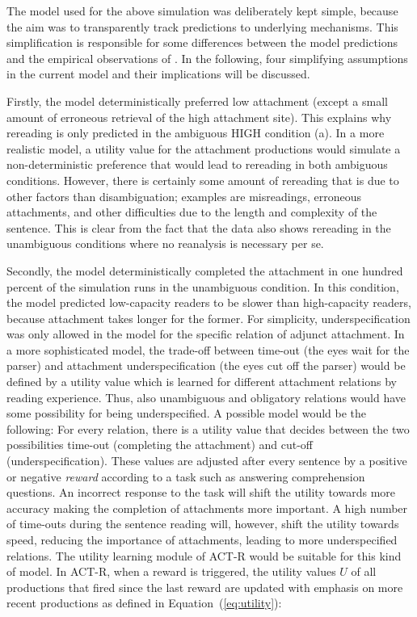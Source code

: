 \documentclass{cambridge7A}\usepackage[]{graphicx}\usepackage[]{color}
\begin{document}
The model used for the above simulation was deliberately kept simple, because the aim was to transparently track predictions to underlying mechanisms. This simplification is responsible for some differences between the model predictions and the empirical observations of \cite{MalsburgVasishth2013}. In the following, four simplifying assumptions in the current model and their implications will be discussed.

Firstly, the model deterministically preferred low attachment (except a small amount of erroneous retrieval of the high attachment site). This explains why rereading is only predicted in the ambiguous HIGH condition (a). In a more realistic model, a utility value for the attachment productions would simulate a non-deterministic preference that would lead to rereading in both ambiguous conditions. However, there is certainly some amount of rereading that is due to other factors than disambiguation; examples are misreadings, erroneous attachments, and other difficulties due to the length and complexity of the sentence. This is clear from the fact that the data also shows rereading in the unambiguous conditions where no reanalysis is necessary per se.

Secondly, the model deterministically completed the attachment in one hundred percent of the simulation runs in the unambiguous condition. In this condition, the model predicted low-capacity readers to be slower than high-capacity readers, because attachment takes longer for the former. For simplicity, underspecification was only allowed in the model for the specific relation of adjunct attachment.
In a more sophisticated model, the trade-off between time-out (the eyes wait for the parser) and attachment underspecification (the eyes cut off the parser) would be defined by a utility value which is learned for different attachment relations by reading experience. Thus, also unambiguous and obligatory relations would have some possibility for being underspecified. 
A possible model would be the following:
For every relation, there is a utility value that decides between the two possibilities time-out (completing the attachment) and cut-off (underspecification). These values are adjusted after every sentence by a positive or negative \emph{reward} according to a task such as answering comprehension questions. An incorrect response to the task will shift the utility towards more accuracy making the completion of attachments more important. A high number of time-outs during the sentence reading will, however, shift the utility towards speed, reducing the importance of attachments, leading to more underspecified relations. 
The utility learning module of ACT-R would be suitable for this kind of model. In ACT-R, when a reward is triggered, the utility values $U$ of all productions that fired since the last reward are updated with emphasis on more recent productions as defined in Equation~(\ref{eq:utility}):
\end{document}

